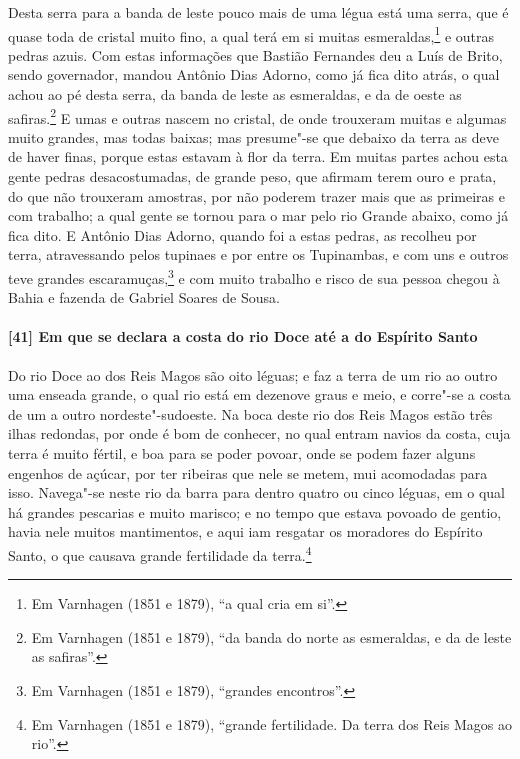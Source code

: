 \begin{linenumbers}
Desta serra para a banda de leste pouco mais de uma légua está uma serra, que é quase toda
de cristal muito fino, a qual terá em si muitas esmeraldas,\footnote{ Em Varnhagen (1851 e
1879), ``a qual cria em si''.} e outras pedras azuis. Com estas informações que Bastião
Fernandes deu a Luís de Brito, sendo governador, mandou Antônio Dias Adorno, como já fica
dito atrás, o qual achou ao pé desta serra, da banda de leste as esmeraldas, e da de oeste
as safiras.\footnote{ Em Varnhagen (1851 e 1879), ``da banda do norte as esmeraldas, e da
de leste as safiras''.} E umas e outras nascem no cristal, de onde trouxeram muitas e
algumas muito grandes, mas todas baixas; mas presume"-se que debaixo da terra as deve de
haver finas, porque estas estavam à flor da terra. Em muitas partes achou esta gente
pedras desacostumadas, de grande peso, que afirmam terem ouro e prata, do que não
trouxeram amostras, por não poderem trazer mais que as primeiras e com trabalho; a qual
gente se tornou para o mar pelo rio Grande abaixo, como já fica dito. E Antônio Dias
Adorno, quando foi a estas pedras, as recolheu por terra, atravessando pelos tupinaes e
por entre os Tupinambas, e com uns e outros teve grandes escaramuças,\footnote{ Em
Varnhagen (1851 e 1879), ``grandes encontros''.} e com muito trabalho e risco de sua
pessoa chegou à Bahia e fazenda de Gabriel Soares de Sousa.

\paragraph{[41] Em que se declara a costa do rio Doce até a do Espírito Santo} \quad
Do rio Doce ao dos Reis Magos são oito léguas; e faz a terra de um rio ao outro uma
enseada grande, o qual rio está em dezenove graus e meio, e corre"-se a costa de um a outro
nordeste"-sudoeste. Na boca deste rio dos Reis Magos estão três ilhas redondas, por onde é
bom de conhecer, no qual entram navios da costa, cuja terra é muito fértil, e boa para se
poder povoar, onde se podem fazer alguns engenhos de açúcar, por ter ribeiras que nele se
metem, mui acomodadas para isso. Navega"-se neste rio da barra para dentro quatro ou cinco
léguas, em o qual há grandes pescarias e muito marisco; e no tempo que estava povoado de
gentio, havia nele muitos mantimentos, e aqui iam resgatar os moradores do Espírito Santo,
o que causava grande fertilidade da terra.\footnote{ Em Varnhagen (1851 e 1879), ``grande
fertilidade. Da terra dos Reis Magos ao rio''.}


\end{linenumbers}
